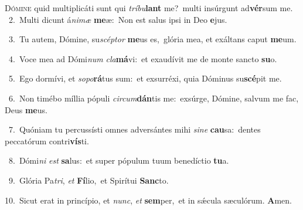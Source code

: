 \lettrine{\initial\textcolor{\initialcolor}{D}}{ómine} quid multiplicáti sunt qui \textit{trí}\-\textit{bu}\textbf{lant} me?~\star multi insúrgunt ad\-\textbf{vér}\-sum me.\\
{\numbfont\textcolor{\numbcolor}{~2.}}~Multi dicunt á\-\textit{ni}\-\textit{mæ} \textbf{me}\-æ:~\star Non est salus ipsi in Deo \textbf{e}\-jus.\par
{\numbfont\textcolor{\numbcolor}{~3.}}~Tu autem, Dómine, su\-\textit{scép}\-\textit{tor} \textbf{me}\-us es,~\star glória mea, et exáltans caput \textbf{me}\-um.\par
{\numbfont\textcolor{\numbcolor}{~4.}}~Voce mea ad Dómi\textit{num} \textit{cla}\-\textbf{má}vi:~\star et exaudívit me de monte sancto \textbf{su}\-o.\par
{\numbfont\textcolor{\numbcolor}{~5.}}~Ego dormívi, et \textit{so}\-\textit{po}\textbf{rá}tus sum:~\star et exsurréxi, quia Dóminus su\-\textbf{scé}\-pit me.\par
{\numbfont\textcolor{\numbcolor}{~6.}}~Non timébo míllia pópuli \textit{cir}\-\textit{cum}\textbf{dán}tis me:~\star exsúrge, Dómine, salvum me fac, Deus \textbf{me}\-us.\par
{\numbfont\textcolor{\numbcolor}{~7.}}~Quóniam tu percussísti omnes adversántes mihi \textit{si}\-\textit{ne} \textbf{cau}\-sa:~\star dentes peccatórum contri\-\textbf{vís}\-ti.\par
{\numbfont\textcolor{\numbcolor}{~8.}}~Dómi\textit{ni} \textit{est} \textbf{sa}\-lus:~\star et super pópulum tuum benedíctio \textbf{tu}\-a.\par
{\numbfont\textcolor{\numbcolor}{~9.}}~Glória Pa\-\textit{tri}\-, \textit{et} \textbf{Fí}\-lio,~\star et Spirítui \textbf{Sanc}\-to.\par
{\numbfont\textcolor{\numbcolor}{10.}}~Sicut erat in princípio, et \textit{nunc}\-, \textit{et} \textbf{sem}\-per,~\star et in sǽcula sæculórum. \textbf{A}\-men.\par
